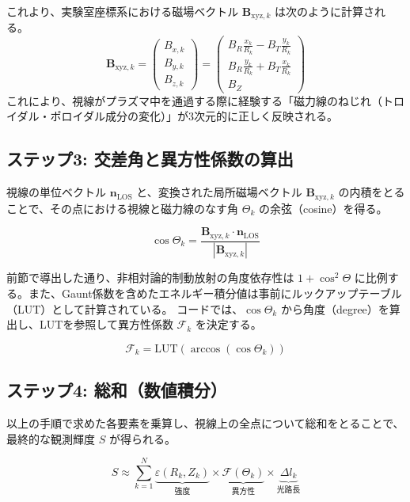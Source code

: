 \documentclass[a4paper,11pt]{bxjsarticle} %
\begin{document}
これより、実験室座標系における磁場ベクトル $\bm{B}_{\mathrm{xyz}, k}$ は次のように計算される。
\begin{equation}
    \bm{B}_{\mathrm{xyz}, k} = 
    \begin{pmatrix}
        B_{x,k} \\
        B_{y,k} \\
        B_{z,k}
    \end{pmatrix}
    =
    \begin{pmatrix}
        B_R \frac{x_k}{R_k} - B_T \frac{y_k}{R_k} \\
        B_R \frac{y_k}{R_k} + B_T \frac{x_k}{R_k} \\
        B_Z
    \end{pmatrix}
\end{equation}
これにより、視線がプラズマ中を通過する際に経験する「磁力線のねじれ（トロイダル・ポロイダル成分の変化）」が3次元的に正しく反映される。

\subsection{ステップ3: 交差角と異方性係数の算出}
視線の単位ベクトル $\bm{n}_{\mathrm{LOS}}$ と、変換された局所磁場ベクトル $\bm{B}_{\mathrm{xyz}, k}$ の内積をとることで、その点における視線と磁力線のなす角 $\Theta_k$ の余弦（cosine）を得る。

\begin{equation}
    \cos\Theta_k = \frac{\bm{B}_{\mathrm{xyz}, k} \cdot \bm{n}_{\mathrm{LOS}}}{|\bm{B}_{\mathrm{xyz}, k}|}
\end{equation}

前節で導出した通り、非相対論的制動放射の角度依存性は $1+\cos^2\Theta$ に比例する。また、Gaunt係数を含めたエネルギー積分値は事前にルックアップテーブル（LUT）として計算されている。
コードでは、$\cos\Theta_k$ から角度（degree）を算出し、LUTを参照して異方性係数 $\mathcal{F}_k$ を決定する。

\begin{equation}
    \mathcal{F}_k = \mathrm{LUT}(\arccos(\cos\Theta_k))
\end{equation}

\subsection{ステップ4: 総和（数値積分）}
以上の手順で求めた各要素を乗算し、視線上の全点について総和をとることで、最終的な観測輝度 $S$ が得られる。

\begin{equation}
    S \approx \sum_{k=1}^{N} \underbrace{\varepsilon(R_k, Z_k)}_{\text{強度}} \times \underbrace{\mathcal{F}(\Theta_k)}_{\text{異方性}} \times \underbrace{\Delta l_k}_{\text{光路長}}
\end{equation}
\end{document}
